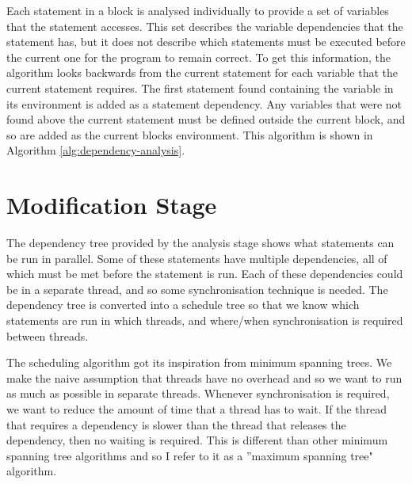 Each statement in a block is analysed individually to provide a set of variables that the statement accesses. This set describes the variable dependencies that the statement has, but it does not describe which statements must be executed before the current one for the program to remain correct. To get this information, the algorithm looks backwards from the current statement for each variable that the current statement requires. The first statement found containing the variable in its environment is added as a statement dependency. Any variables that were not found above the current statement must be defined outside the current block, and so are added as the current blocks environment. This algorithm is shown in Algorithm \autoref{alg:dependency-analysis}.


\section{Modification Stage}

The dependency tree provided by the analysis stage shows what statements can be run in parallel. Some of these statements have multiple dependencies, all of which must be met before the statement is run. Each of these dependencies could be in a separate thread, and so some synchronisation technique is needed. The dependency tree is converted into a schedule tree so that we know which statements are run in which threads, and where/when synchronisation is required between threads.

The scheduling algorithm got its inspiration from minimum spanning trees. We make the naive assumption that threads have no overhead and so we want to run as much as possible in separate threads. Whenever synchronisation is required, we want to reduce the amount of time that a thread has to wait. If the thread that requires a dependency is slower than the thread that releases the dependency, then no waiting is required. This is different than other minimum spanning tree algorithms and so I refer to it as a ''maximum spanning tree" algorithm.

